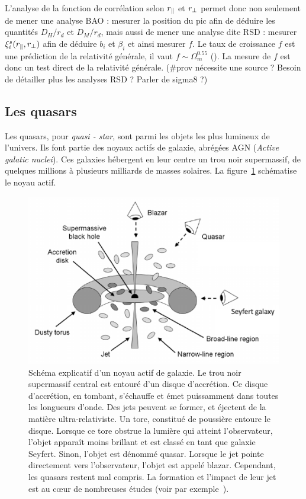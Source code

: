 \documentclass[11pt, twoside, a4paper, openright]{report}
\begin{document}
L'analyse de la fonction de corrélation selon $r_{\parallel}{}$ et $r_{\perp}{}$ permet donc non seulement de mener une analyse BAO : mesurer la position du pic afin de déduire les quantités $D_{H} / r_d$ et $D_{M} / r_d$, mais aussi de mener une analyse dite RSD : mesurer $\xi_i^s(r_{\parallel}{}, r_{\perp}{})$ afin de déduire $b_i$ et $\beta_i$ et ainsi mesurer $f$. Le taux de croissance $f$ est une prédiction de la relativité générale, il vaut $f \sim \Omega_{m}^{\num{0.55}}$ (\cite{Linder2007}). La mesure de $f$ est donc un test direct de la relativité générale. (\#prov nécessite une source ? Besoin de détailler plus les analyses RSD ? Parler de sigma8 ?)

\subsection{Les quasars}
Les quasars, pour \emph{quasi - star}, sont parmi les objets les plus lumineux de l'univers. Ils font partie des noyaux actifs de galaxie, abrégées AGN (\emph{Active galatic nuclei}). Ces galaxies hébergent en leur centre un trou noir supermassif, de quelques millions à plusieurs milliards de masses solaires. La figure~\ref{fig:schema_qso} schématise le noyau actif. 
\begin{figure}
  \centering
  \includegraphics[scale=0.68]{schema_qso2}
  \caption{Schéma explicatif d'un noyau actif de galaxie. Le trou noir supermassif central est entouré d'un disque d'accrétion. Ce disque d'accrétion, en tombant, s'échauffe et émet puissamment dans toutes les longueurs d'onde. Des jets peuvent se former, et éjectent de la matière ultra-relativiste. Un tore, constitué de poussière entoure le disque. Lorsque ce tore obstrue la lumière qui atteint l'observateur, l'objet apparaît moins brillant et est classé en tant que galaxie Seyfert.  Sinon, l'objet est dénommé quasar. Lorsque le jet pointe directement vers l'observateur, l'objet est appelé blazar.
  Cependant, les quasars restent mal compris. La formation et l'impact de leur jet est au c{\oe}ur de nombreuses études (voir par exemple~\cite{Chabanier2020}).}
  \label{fig:schema_qso}
\end{figure}
\end{document}
